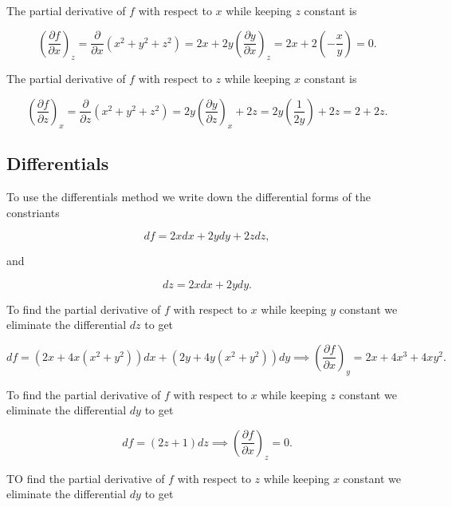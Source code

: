 \documentclass[english,a4paper,12pt]{report}
\begin{document}
The partial derivative of \(f\) with respect to \(x\) while keeping \(z\) constant is

\begin{equation}
	\left( \frac{\partial f}{\partial x} \right)_{z} = \frac{\partial }{\partial x} (x^2+y^2+z^2) = 2x + 2y \left( \frac{\partial y}{\partial x} \right)_{z} = 2x + 2\left( -\frac{x}{y}  \right)  = 0.
\end{equation}

The partial derivative of \(f\) with respect to \(z\) while keeping \(x\) constant is


\begin{equation}
	\left( \frac{\partial f}{\partial z} \right)_{x} = \frac{\partial }{\partial z} (x^2+y^2+z^2) = 2y \left( \frac{\partial y}{\partial z} \right)_{x} + 2z = 2y \left( \frac{1}{2y} \right) + 2z = 2+2z.
\end{equation}

\subsection{Differentials}

To use the differentials method we write down the differential forms of the constriants

\begin{equation}
	df = 2x dx + 2y dy + 2z dz,
\end{equation}

and 

\begin{equation}
	dz = 2x dx + 2y dy.
\end{equation}

To find the partial derivative of \(f\) with respect to \(x\) while keeping \(y\) constant we eliminate the differential \(dz\) to get 

\begin{equation}
	df = (2x + 4x(x^2+y^2))dx + (2y+4y(x^2+y^2))dy \implies \left( \frac{\partial f}{\partial x} \right)_{y} = 2x + 4x^3 + 4xy^2.
\end{equation}

To find the partial derivative of \(f\) with respect to \(x\) while keeping \(z\) constant we eliminate the differential \(dy\) to get 

\begin{equation}
	df = (2z+1)dz \implies \left( \frac{\partial f}{\partial x} \right)_{z} = 0. 
\end{equation}

TO find the partial derivative of \(f\) with respect to \(z\) while keeping \(x\) constant we eliminate the differential \(dy\) to get 
\end{document}
